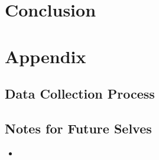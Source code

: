 \documentclass[a4paper,11pt]{article}
\begin{document}
\section{Conclusion}


\newpage
\printbibliography

\newpage
\section*{Appendix}
\subsection*{Data Collection Process}

\subsection*{Notes for Future Selves}
\begin{itemize}
    \item 
\end{itemize}
\end{document}
